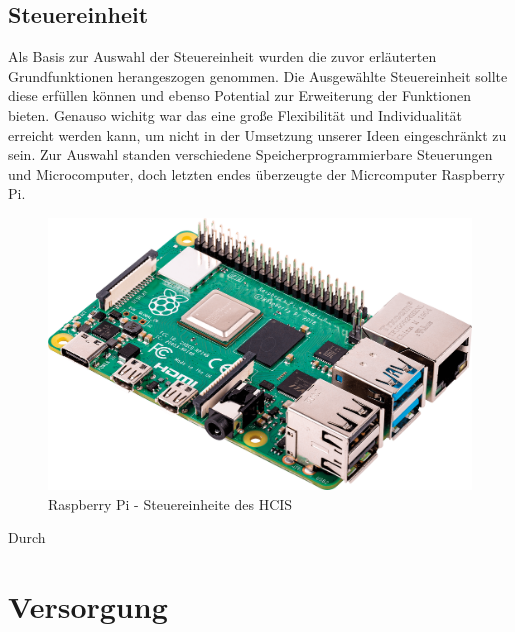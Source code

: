 \newpage

\subsection{Steuereinheit}
Als Basis zur Auswahl der Steuereinheit wurden die zuvor erläuterten Grundfunktionen herangeszogen genommen. Die Ausgewählte Steuereinheit sollte diese erfüllen können und ebenso Potential zur Erweiterung der Funktionen bieten. Genauso wichitg war das eine große Flexibilität und Individualität erreicht werden kann, um nicht in der Umsetzung unserer Ideen eingeschränkt zu sein. Zur Auswahl standen verschiedene Speicherprogrammierbare Steuerungen und Microcomputer, doch letzten endes überzeugte der Micrcomputer Raspberry Pi.

\begin{figure}[H]
	\begin{center}
		\includegraphics[scale=0.1]{figures/hcis/raspberryPi.png}
		\caption{Raspberry Pi - Steuereinheite des HCIS}
	\end{center}
\end{figure}

Durch 

\newpage



\section{Versorgung}

